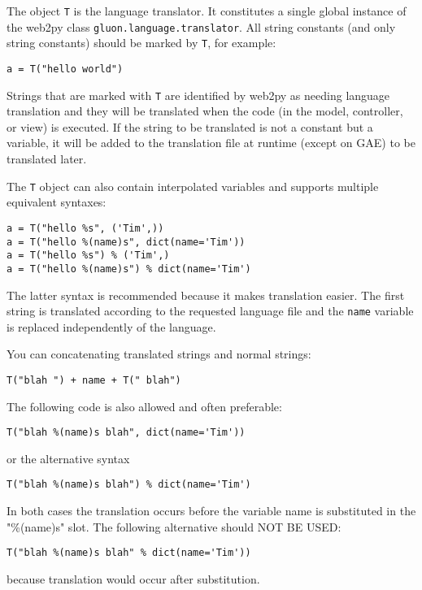 \documentclass[justified,sixbynine,notoc]{tufte-book}
\def\ft{\small\tt}
\def\inxx#1{\index{#1}}
\begin{document}
\begin{fullwidth}
\inxx{T} \inxx{internationalization}

The object {\ft T} is the language translator. It constitutes a single global instance of the web2py class {\ft gluon.language.translator}. All string constants (and only string constants) should be marked by {\ft T}, for example:
\begin{lstlisting}
a = T("hello world")
\end{lstlisting}

Strings that are marked with {\ft T} are identified by web2py as needing language translation and they will be translated when the code (in the model, controller, or view) is executed. If the string to be translated is not a constant but a variable, it will be added to the translation file at runtime (except on GAE) to be translated later.

The {\ft T} object can also contain interpolated variables and supports multiple equivalent syntaxes:
\begin{lstlisting}
a = T("hello %s", ('Tim',))
a = T("hello %(name)s", dict(name='Tim'))
a = T("hello %s") % ('Tim',)
a = T("hello %(name)s") % dict(name='Tim')
\end{lstlisting}

The latter syntax is recommended because it makes translation easier.
The first string is translated according to the requested language file and the {\ft name} variable is replaced independently of the language.

You can concatenating translated strings and normal strings:
\begin{lstlisting}
T("blah ") + name + T(" blah")
\end{lstlisting}

The following code is also allowed and often preferable:

\begin{lstlisting}
T("blah %(name)s blah", dict(name='Tim'))
\end{lstlisting}
\noindent or the alternative syntax
\begin{lstlisting}
T("blah %(name)s blah") % dict(name='Tim')
\end{lstlisting}

In both cases the translation occurs before the variable name is substituted in the "\%(name)s" slot. The following alternative should NOT BE USED:
\begin{lstlisting}
T("blah %(name)s blah" % dict(name='Tim'))
\end{lstlisting}
\noindent because translation would occur after substitution.


\end{fullwidth}
\end{document}
